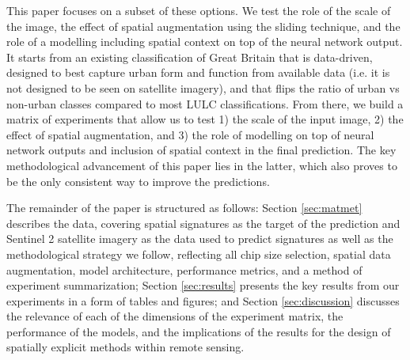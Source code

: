This paper focuses on a subset of these options. We test the role of the scale of the
image, the effect of spatial augmentation using the sliding technique, and the role of a
modelling including spatial context on top of the neural network output. It starts from
an existing classification of Great Britain that is data-driven, designed to best
capture urban form and function from available data (i.e. it is not designed to be seen
on satellite imagery), and that flips the ratio of urban vs non-urban classes compared
to most LULC classifications. From there, we build a matrix of experiments that allow us
to test 1) the scale of the input image, 2) the effect of spatial augmentation, and 3)
the role of modelling on top of neural network outputs and inclusion of spatial context
in the final prediction. The key methodological advancement of this paper lies in the
latter, which also proves to be the only consistent way to improve the predictions.

The remainder of the paper is structured as follows: Section \ref{sec:matmet} describes
the data, covering spatial signatures as the target of the prediction and Sentinel 2
satellite imagery as the data used to predict signatures as well as the methodological
strategy we follow, reflecting all chip size selection, spatial data augmentation, model
architecture, performance metrics, and a method of experiment summarization; Section
\ref{sec:results} presents the key results from our experiments in a form of tables and
figures; and Section \ref{sec:discussion} discusses the relevance of each of the
dimensions of the experiment matrix, the performance of the models, and the implications
of the results for the design of spatially explicit methods within remote sensing.


